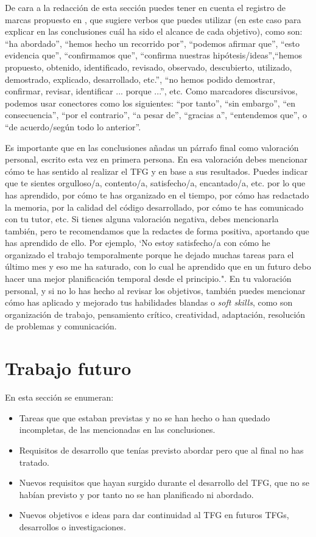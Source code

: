  De cara a la redacción de esta sección puedes tener en cuenta el registro de marcas propuesto en \cite{meza2019comunicacion}, que sugiere verbos que puedes utilizar (en este caso para explicar en las conclusiones cuál ha sido el alcance de cada objetivo), como son: ``ha abordado'', ``hemos hecho un recorrido por'', ``podemos afirmar que'', ``esto evidencia que'', ``confirmamos que'', ``confirma nuestras hipótesis/ideas'',``hemos propuesto, obtenido, identificado, revisado, observado, descubierto, utilizado, demostrado, explicado, desarrollado, etc.'',  ``no hemos podido demostrar, confirmar, revisar, identificar ... porque ...'', etc. Como marcadores discursivos, podemos usar conectores como los siguientes: ``por tanto'', ``sin embargo'', ``en consecuencia'', ``por el contrario'', ``a pesar de'', ``gracias a'', ``entendemos que'', o ``de acuerdo/según todo lo anterior''.
 
Es importante que en las conclusiones añadas un párrafo final como valoración personal, escrito esta vez en primera persona. En esa valoración debes mencionar cómo te has sentido al realizar el TFG y en base a sus resultados. Puedes indicar que te sientes orgulloso/a, contento/a, satisfecho/a, encantado/a, etc. por lo que has aprendido, por cómo te has organizado en el tiempo, por cómo has redactado la memoria, por la calidad del código desarrollado, por cómo te has comunicado con tu tutor, etc. Si tienes alguna valoración negativa, debes mencionarla también, pero te recomendamos que la redactes de forma positiva, aportando que has aprendido de ello. Por ejemplo, `No estoy satisfecho/a con cómo he organizado el trabajo temporalmente porque he dejado muchas tareas para el último mes y eso me ha saturado, con lo cual he aprendido que en un futuro debo hacer una mejor planificación temporal desde el principio.". En tu valoración personal, y si no lo has hecho al revisar los objetivos, también puedes mencionar cómo has aplicado y mejorado tus habilidades blandas o \textit{soft skills}, como son organización de trabajo, pensamiento crítico, creatividad, adaptación, resolución de problemas y comunicación. 

 \section{Trabajo futuro}

 En esta sección se enumeran:
 \begin{itemize}
     \item Tareas que que estaban previstas y no se han hecho o han quedado incompletas, de las mencionadas en las conclusiones.
     \item Requisitos de desarrollo que tenías previsto abordar pero que al final no has tratado.
     \item Nuevos requisitos que hayan surgido durante el desarrollo del TFG, que no se habían previsto y por tanto no se han planificado ni abordado.
     \item Nuevos objetivos e ideas para dar continuidad al TFG en futuros TFGs, desarrollos o investigaciones.
 \end{itemize} 

